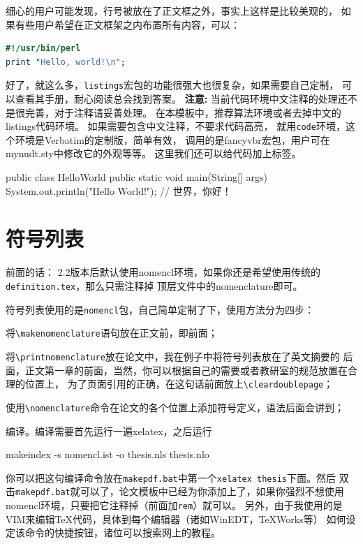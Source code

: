 细心的用户可能发现，行号被放在了正文框之外，事实上这样是比较美观的，
如果有些用户希望在正文框架之内布置所有内容，可以：
\begin{lstlisting}[language=perl,xleftmargin=2em,framexleftmargin=1.5em]
#!/usr/bin/perl
print "Hello, world!\n";
\end{lstlisting}

好了，就这么多，\texttt{listings}宏包的功能很强大也很复杂，如果需要自己定制，
可以查看其手册，耐心阅读总会找到答案。
\textbf{注意:} 当前代码环境中文注释的处理还不是很完善，对于注释请妥善处理。
在本模板中，推荐算法环境或者去掉中文的listings代码环境。
如果需要包含中文注释，不要求代码高亮，
就用\texttt{code}环境，这个环境是Verbatim的定制版，简单有效，
调用的是fancyvbr宏包，用户可在mynudt.sty中修改它的外观等等。
这里我们还可以给代码加上标签。
\begin{code}[label=hello.c]
public class HelloWorld {
   public static void main(String[] args) {
      System.out.println("Hello World!");
   }
}   // 世界，你好！
\end{code}

\section{符号列表}

{\hei 前面的话：}{\kai\color{blue}
2.2版本后默认使用nomencl环境，如果你还是希望使用传统的\verb|definition.tex|，那么只需注释掉
顶层文件中的nomenclature即可。}

符号列表使用的是\verb|nomencl|包，自己简单定制了下，使用方法分为四步：
\begin{compactenum}
\item 将\verb|\makenomenclature|语句放在正文前，即\verb||前面；
\item 将\verb|\printnomenclature|放在论文中，我在例子中将符号列表放在了英文摘要的
后面，正文第一章的前面，当然，你可以根据自己的需要或者教研室的规范放置在合理的位置上，
为了页面引用的正确，在这句话前面放上\verb|\cleardoublepage|；
\item 使用\verb|\nomenclature|命令在论文的各个位置上添加符号定义，语法后面会讲到；
\item 编译。编译需要首先运行一遍xelatex，之后运行
\begin{code}
makeindex -s nomencl.ist -o thesis.nls thesis.nlo
\end{code}
\end{compactenum}

你可以把这句编译命令放在\verb|makepdf.bat|中第一个\verb|xelatex thesis|下面。然后
双击\verb|makepdf.bat|就可以了，论文模板中已经为你添加上了，如果你强烈不想使用
nomencl环境，只要把它注释掉（前面加\verb|rem|）就可以。
另外，由于我使用的是VIM来编辑\TeX{}代码，具体到每个编辑器（诸如WinEDT，TeXWorks等）
如何设定该命令的快捷按钮，诸位可以搜索网上的教程。

